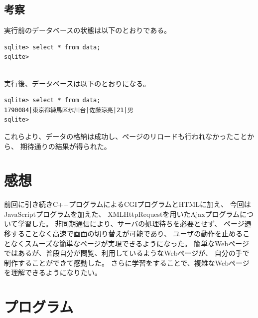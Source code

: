 \documentclass[a4j]{jarticle}
\begin{document}
\subsection{考察}
実行前のデータベースの状態は以下のとおりである。
\begin{screen}
\begin{verbatim}
sqlite> select * from data;
sqlite>
\end{verbatim}
\end{screen}\\

実行後、データベースは以下のとおりになる。
\begin{screen}
\begin{verbatim}
sqlite> select * from data;
1790084|東京都練馬区氷川台|佐藤涼亮|21|男
sqlite> 
\end{verbatim}
\end{screen}
これらより、データの格納は成功し、ページのリロードも行われなかったことから、
期待通りの結果が得られた。
\section{感想}
前回に引き続きC++プログラムによるCGIプログラムとHTMLに加え、
今回はJavaScriptプログラムを加えた、
XMLHttpRequestを用いたAjaxプログラムについて学習した。
非同期通信により、サーバの処理待ちを必要とせず、
ページ遷移することなく高速で画面の切り替えが可能であり、
ユーザの動作を止めることなくスムーズな簡単なページが実現できるようになった。
簡単なWebページではあるが、普段自分が閲覧、利用しているようなWebページが、
自分の手で制作することができて感動した。
さらに学習をすることで、複雑なWebページを理解できるようになりたい。

\section{プログラム}



\end{document}
